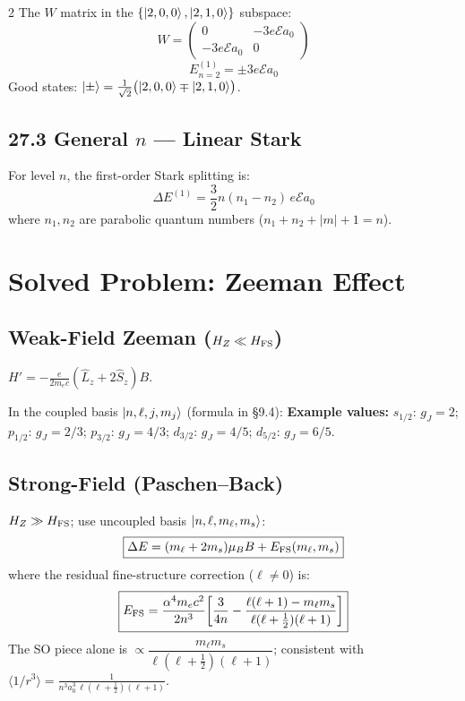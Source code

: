 \documentclass[9pt,a4paper]{article} %
\begin{document}
\begin{multicols}{2}
The $W$ matrix in the $\{\ket{2,0,0},\ket{2,1,0}\}$ subspace:
\[
W = \begin{pmatrix} 0 & -3e\mathcal{E}a_0 \\ -3e\mathcal{E}a_0 & 0 \end{pmatrix}
\]
\[
\boxed{E_{n=2}^{(1)} = \pm 3e\mathcal{E}a_0}
\]
Good states: $\ket{\pm} = \frac{1}{\sqrt{2}}\bigl(\ket{2,0,0} \mp \ket{2,1,0}\bigr)$.

\subsection{27.3 General $n$ — Linear Stark}
For level $n$, the first-order Stark splitting is:
\[
\Delta E^{(1)} = \frac{3}{2} n(n_1 - n_2)\, e\mathcal{E}a_0
\]
where $n_1, n_2$ are parabolic quantum numbers ($n_1 + n_2 + |m| + 1 = n$).

\section{Solved Problem: Zeeman Effect}

\subsection{Weak-Field Zeeman ($H_Z \ll H_{\rm FS}$)}
$H' = -\frac{e}{2m_e c}(\hat{L}_z + 2\hat{S}_z)B$.

In the coupled basis $\ket{n,\ell,j,m_j}$ (formula in \S9.4):
{\footnotesize
\textbf{Example values:}
$s_{1/2}$: $g_J = 2$;\quad
$p_{1/2}$: $g_J = 2/3$;\quad
$p_{3/2}$: $g_J = 4/3$;\quad
$d_{3/2}$: $g_J = 4/5$;\quad
$d_{5/2}$: $g_J = 6/5$.
}

\subsection{Strong-Field (Paschen--Back)}
$H_Z \gg H_{\rm FS}$; use uncoupled basis $\ket{n,\ell,m_\ell,m_s}$:
\[
\boxed{\Delta E = (m_\ell + 2m_s)\mu_B B + E_{\rm FS}(m_\ell, m_s)}
\]
where the residual fine-structure correction ($\ell\ne 0$) is:
\[
\boxed{E_{\rm FS} = \frac{\alpha^4 m_e c^2}{2n^3}\!\left[\frac{3}{4n} - \frac{\ell(\ell+1)-m_\ell m_s}{\ell(\ell+\tfrac{1}{2})(\ell+1)}\right]}
\]
The SO piece alone is $\propto \dfrac{m_\ell m_s}{\ell(\ell+\frac{1}{2})(\ell+1)}$; consistent with $\langle1/r^3\rangle=\frac{1}{n^3a_0^3\,\ell(\ell+\frac{1}{2})(\ell+1)}$.


\end{multicols}
\end{document}
